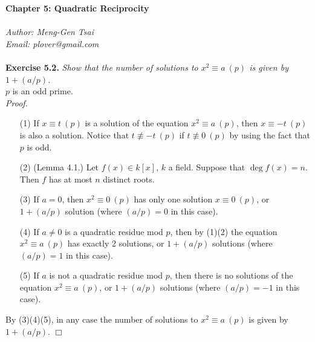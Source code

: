 \documentclass{article}
\begin{document}
\textbf{\Large Chapter 5: Quadratic Reciprocity} \\\\



\emph{Author: Meng-Gen Tsai} \\
\emph{Email: plover@gmail.com} \\\\






\textbf{Exercise 5.2.}
\emph{Show that the number of solutions to $x^2 \equiv a \: (p)$
is given by $1 + (a/p)$.} \\

$p$ is an odd prime. \\

\emph{Proof.}
\begin{enumerate}
\item[(1)]
If $x \equiv t \: (p)$ is a solution of the equation $x^2 \equiv a \: (p)$,
then $x \equiv -t \: (p)$ is also a solution.
Notice that $t \not\equiv -t \: (p)$ if $t \not\equiv 0 \: (p)$
by using the fact that $p$ is odd.
\item[(2)]
(Lemma 4.1.) Let $f(x) \in k[x]$, $k$ a field. Suppose that $\deg f(x) = n$.
Then $f$ has at most $n$ distinct roots.
\item[(3)]
If $a = 0$, then $x^2 \equiv 0 \: (p)$ has only one solution $x \equiv 0 \: (p)$,
or $1 + (a/p)$ solution (where $(a/p) = 0$ in this case).
\item[(4)]
If $a \neq 0$ is a quadratic residue mod $p$, then by (1)(2)
the equation $x^2 \equiv a \: (p)$ has exactly 2 solutions, or $1 + (a/p)$ solutions
(where $(a/p) = 1$ in this case).
\item[(5)]
If $a$ is not a quadratic residue mod $p$,
then there is no solutions of the equation $x^2 \equiv a \: (p)$,
or $1 + (a/p)$ solutions (where $(a/p) = -1$ in this case).
\end{enumerate}
By (3)(4)(5), in any case the number of solutions to $x^2 \equiv a \: (p)$
is given by $1 + (a/p)$.
$\Box$ \\\\



\end{document}
